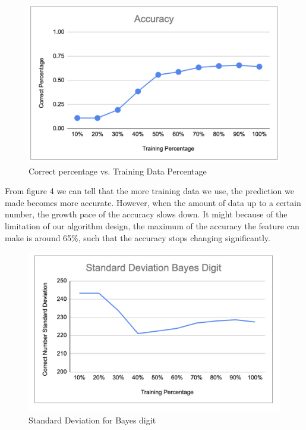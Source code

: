 \documentclass[11pt]{report}
\begin{document}
\begin{figure}[h]
\begin{center}
\includegraphics[scale=0.45]{Bayes_digit_accuracy.png} 
\end{center}
\caption{Correct percentage vs. Training Data Percentage}
\end{figure}


From figure 4 we can tell that the more training data we use, the prediction we made becomes more accurate. However, when the amount of data up to a certain number, the growth pace of the accuracy slows down. It might because of the limitation of our algorithm design, the maximum of the accuracy the feature can make is around 65\%, such that the accuracy stops changing significantly. 

\begin{figure}[h]
\begin{center}
\includegraphics[scale=0.5]{Bayes_digit_SD.png} 
\end{center}
\caption{Standard Deviation for Bayes digit}
\end{figure}
\end{document}
